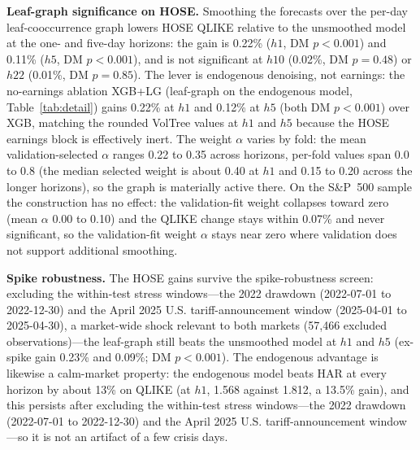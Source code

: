 \documentclass[runningheads,a4paper]{llncs}
\begin{document}
\textbf{Leaf-graph significance on HOSE.} Smoothing the forecasts over the per-day leaf-cooccurrence graph
lowers HOSE QLIKE relative to the unsmoothed model at the one- and five-day
horizons: the gain is 0.22\% ($h1$, DM $p<0.001$) and 0.11\% ($h5$, DM $p<0.001$), and is not
significant at $h10$ (0.02\%, DM $p=0.48$) or $h22$ (0.01\%, DM $p=0.85$).
The lever is endogenous denoising, not earnings: the no-earnings ablation XGB+LG (leaf-graph on the
endogenous model, Table~\ref{tab:detail}) gains 0.22\% at $h1$ and 0.12\% at $h5$ (both DM $p<0.001$) over
XGB, matching the rounded VolTree values at $h1$ and $h5$ because the HOSE earnings block is effectively
inert.
The weight $\alpha$ varies by fold: the mean validation-selected $\alpha$ ranges 0.22 to 0.35 across
horizons, per-fold values span 0.0 to 0.8 (the median selected weight is about 0.40 at $h1$ and 0.15 to 0.20 across
the longer horizons), so the graph is materially active there. On the S\&P~500 sample the construction has no effect:
the validation-fit weight collapses toward zero (mean $\alpha$ 0.00 to 0.10) and the QLIKE change stays
within 0.07\% and never significant, so the validation-fit weight $\alpha$ stays near zero where validation
does not support additional smoothing.

\textbf{Spike robustness.} The HOSE gains survive the spike-robustness screen: excluding the within-test
stress windows---the 2022 drawdown (2022-07-01 to 2022-12-30) and the April 2025 U.S.
tariff-announcement window (2025-04-01 to 2025-04-30), a market-wide shock relevant to both markets
(57{,}466 excluded observations)---the leaf-graph still beats the unsmoothed model at
$h1$ and $h5$ (ex-spike gain 0.23\% and 0.09\%; DM $p<0.001$).
The endogenous advantage is likewise a calm-market property: the endogenous model beats HAR at every
horizon by about 13\% on QLIKE (at $h1$, 1.568 against 1.812, a 13.5\% gain), and this persists after
excluding the within-test stress windows---the 2022 drawdown (2022-07-01 to 2022-12-30) and the April 2025
U.S. tariff-announcement window---so it is not an artifact of a few crisis days.
\end{document}

